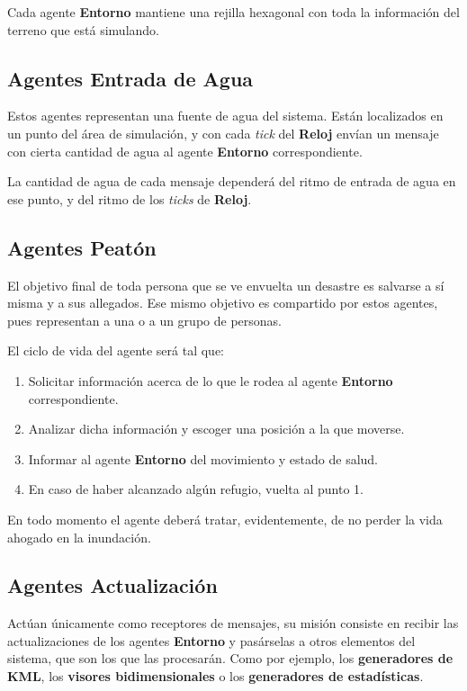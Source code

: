 Cada agente {\bf Entorno} mantiene una rejilla hexagonal con toda la
información del terreno que está simulando.

\subsection*{Agentes Entrada de Agua}

Estos agentes representan una fuente de agua del sistema. Están localizados en
un punto del área de simulación, y con cada {\em tick} del {\bf Reloj} envían
un mensaje con cierta cantidad de agua al agente {\bf Entorno} correspondiente.

La cantidad de agua de cada mensaje dependerá del ritmo de entrada de agua en
ese punto, y del ritmo de los {\em ticks} de {\bf Reloj}.

\subsection*{Agentes Peatón}

El objetivo final de toda persona que se ve envuelta un desastre es salvarse a
sí misma y a sus allegados. Ese mismo objetivo es compartido por estos agentes,
pues representan a una o a un grupo de personas.

El ciclo de vida del agente será tal que:

\begin{enumerate}
 \item Solicitar información acerca de lo que le rodea al agente {\bf
Entorno} correspondiente.
 \item Analizar dicha información y escoger una posición a la que moverse.
 \item Informar al agente {\bf Entorno} del movimiento y estado de salud.
 \item En caso de haber alcanzado algún refugio, vuelta al punto 1.
\end{enumerate}

En todo momento el agente deberá tratar, evidentemente, de no perder la vida
ahogado en la inundación.

\subsection*{Agentes Actualización}

Actúan únicamente como receptores de mensajes, su misión consiste en recibir
las actualizaciones de los agentes {\bf Entorno} y pasárselas a otros elementos
del sistema, que son los que las procesarán. Como por ejemplo, los {\bf
generadores de KML}, los {\bf visores bidimensionales} o los {\bf generadores de
estadísticas}.

